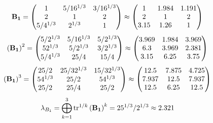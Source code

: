 \documentclass[10pt,a4paper]{article}
\begin{document}
	\[
		\bold{B_1} = 
		\begin{pmatrix}
			{1}{} & {{5}} / {{16^ {1 / 3}}} & {{3}} / {{16^ {1 / 3}}} \\
			{{2}}{} & {1}{} & {{2}}{} \\
			{{5}} / {{4^ {1 / 3}}} & {{2^ {1 / 3}}}{} & {1}{} \\
		\end{pmatrix}
		\approx
		\begin{pmatrix}
			1        & 1.984    & 1.191    \\
			2        & 1        & 2        \\
			3.15     & 1.26     & 1        \\
		\end{pmatrix}
	\]
	\[
		\left(\bold{B_1}\right)^{2} = 
		\begin{pmatrix}
			{{5}} / {{2^ {1 / 3}}} & {{5}} / {{16^ {1 / 3}}} & {{5}} / {{2^ {1 / 3}}} \\
			{{5}{2^ {1 / 3}}}{} & {{5}} / {{2^ {1 / 3}}} & {{3}} / {{2^ {1 / 3}}} \\
			{{5}} / {{4^ {1 / 3}}} & {{25}} / {{4}} & {{15}} / {{4}} \\
		\end{pmatrix}
		\approx
		\begin{pmatrix}
			3.969    & 1.984    & 3.969    \\
			6.3      & 3.969    & 2.381    \\
			3.15     & 6.25     & 3.75     \\
		\end{pmatrix}
	\]
	\[
		\left(\bold{B_1}\right)^{3} = 
		\begin{pmatrix}
			{{25}} / {{2}} & {{25}} / {{32^ {1 / 3}}} & {{15}} / {{32^ {1 / 3}}} \\
			{{5}{4^ {1 / 3}}}{} & {{25}} / {{2}} & {{5}{4^ {1 / 3}}}{} \\
			{{25}} / {{2}} & {{25}} / {{4}} & {{25}} / {{2}} \\
		\end{pmatrix}
		\approx
		\begin{pmatrix}
			12.5     & 7.875    & 4.725    \\
			7.937    & 12.5     & 7.937    \\
			12.5     & 6.25     & 12.5     \\
		\end{pmatrix}
	\]
	\[
		\lambda_{B_1} =  \bigoplus ^{3} _{k = 1} \operatorname{tr} ^{1 / k} \left( \bold{B_1} \right)^k = {{25^ {1 / 3}}} / {{2^ {1 / 3}}}\approx 2.321
	\]
\end{document}
